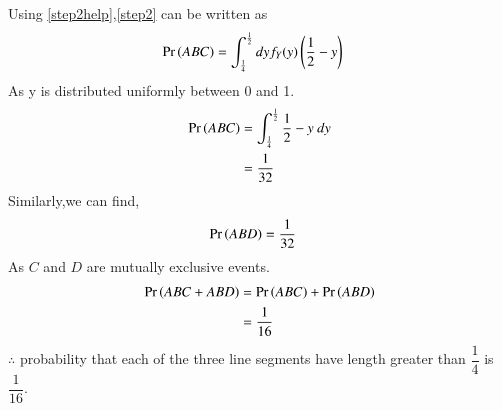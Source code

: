 \documentclass[journal,12pt,twocolumn]{IEEEtran}
\begin{document}
     Using \eqref{step2help},\eqref{step2} can be written as
     \begin{align}
    \Pr\left(ABC\right)&=\int_{\frac{1}{4}}^{\frac{1}{2}}dyf_Y(y)\left(\frac{1}{2}-y\right)
    \end{align}
    As y is distributed uniformly between 0 and 1.
    \begin{align}
   \Pr\left(ABC\right) &=\int_{\frac{1}{4}}^{\frac{1}{2}}\frac{1}{2}-y~dy\\
    &=\dfrac{1}{32}
\end{align}
Similarly,we can find,
\begin{align}
    \Pr\left(ABD\right)&=\dfrac{1}{32}
\end{align}
As $C$ and $D$ are mutually exclusive events.
\begin{align}
    \Pr\left(ABC+ABD\right)&=\Pr\left(ABC\right)+\Pr\left(ABD\right)\\
    &=\dfrac{1}{16} 
\end{align}
$\therefore$ probability that each of the three line segments have length greater than $\dfrac{1}{4}$  is  $\dfrac{1}{16}$.
\end{document}
